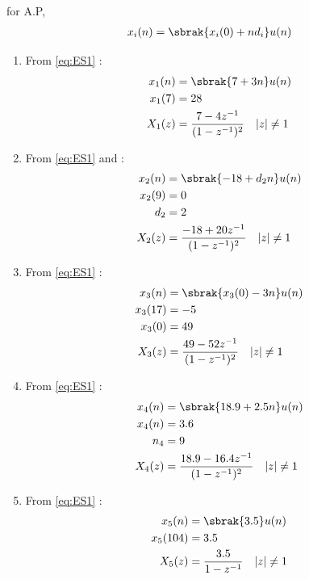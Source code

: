 \documentclass[journal,12pt,twocolumn]{IEEEtran}
\theoremstyle{remark}
\begin{document}
\begin{table}[h!]
  \centering
  
   \label{tab:ESTable1}
\end{table}
\solution
\fi
for A.P,
\begin{align}
    x_i(n) = \sbrak{x_i(0) + nd_i} u(n)
    \label{eq:ES1}
\end{align}
\begin{enumerate}
\item From \eqref{eq:ES1}  :
\begin{align}
x_1(n) &= \sbrak{7+3n}u(n)\\
x_1(7) &= 28\\
X_1(z) &= \frac{7 - 4z^{-1}}{(1 - z^{-1})^2} \quad |z| \neq 1
\end{align}
\item From \eqref{eq:ES1} and  :
\begin{align}
x_2(n) &= \sbrak{-18 + d_2n}u(n)\\
x_2(9) &= 0\\
d_2 &= 2\\
X_2(z) &= \frac{-18 + 20z^{-1}}{(1 - z^{-1})^2}
 \quad |z| \neq 1
\end{align}
\item From \eqref{eq:ES1}  :
\begin{align}
x_3(n) &= \sbrak{x_3(0)-3n}u(n)\\
x_3(17) &= -5\\
x_3(0) &= 49\\
X_3(z) &= \frac{49 - 52z^{-1}}{(1 - z^{-1})^2}
 \quad |z| \neq 1
\end{align}
\item From \eqref{eq:ES1}  :
\begin{align}
x_4(n) &= \sbrak{18.9+2.5n}u(n)\\
x_4(n) &= 3.6\\
n_4    &= 9\\
X_4(z) &= \frac{18.9 - 16.4z^{-1}}{(1 - z^{-1})^2}
 \quad |z| \neq 1
\end{align}
\item From \eqref{eq:ES1}  :
\begin{align}
x_5(n) &= \sbrak{3.5}u(n)\\
x_5(104) &= 3.5\\
X_5(z) &= \frac{3.5}{1-z^{-1}} \quad |z| \neq 1
\end{align}
\begin{figure}[h!]

\end{figure}
\end{enumerate}
\end{document}
